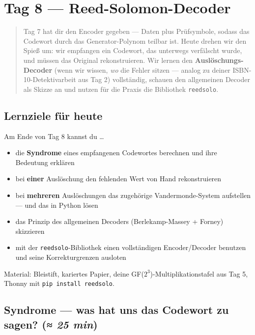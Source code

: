 \chapter{Tag 8 — Reed-Solomon-Decoder}

\begin{quote}
Tag 7 hat dir den Encoder gegeben — Daten plus Prüfsymbole, sodass das
Codewort durch das Generator-Polynom teilbar ist. Heute drehen wir den
Spieß um: wir empfangen ein Codewort, das unterwegs verfälscht wurde,
und müssen das Original rekonstruieren. Wir lernen den
\textbf{Auslöschungs-Decoder} (wenn wir wissen, \emph{wo} die Fehler
sitzen — analog zu deiner ISBN-10-Detektivarbeit aus Tag 2)
vollständig, schauen den allgemeinen Decoder als Skizze an und nutzen
für die Praxis die Bibliothek \texttt{reedsolo}.
\end{quote}

\section*{Lernziele für heute}

Am Ende von Tag 8 kannst du \dots

\begin{itemize}
\item die \textbf{Syndrome} eines empfangenen Codewortes berechnen
  und ihre Bedeutung erklären
\item bei \textbf{einer} Auslöschung den fehlenden Wert von Hand
  rekonstruieren
\item bei \textbf{mehreren} Auslöschungen das zugehörige
  Vandermonde-System aufstellen — und das in Python lösen
\item das Prinzip des allgemeinen Decoders (Berlekamp-Massey +
  Forney) skizzieren
\item mit der \texttt{reedsolo}-Bibliothek einen vollständigen
  Encoder/Decoder benutzen und seine Korrekturgrenzen ausloten
\end{itemize}

Material: Bleistift, kariertes Papier, deine GF($2^3$)-Multi\-pli\-ka\-tions\-tafel
aus Tag 5, Thonny mit \texttt{pip install reedsolo}.

\section{Syndrome — was hat uns das Codewort zu sagen? \normalfont(\textit{≈ 25 min})}

